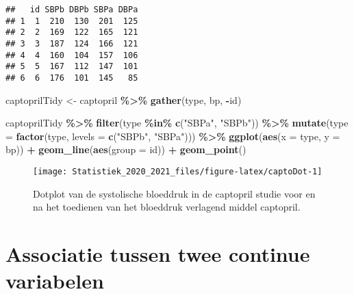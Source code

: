 \documentclass[
  12pt,dutch,coursenotes]{book}
\newenvironment{Shaded}{\begin{snugshade}}{\end{snugshade}}
\newcommand{\DataTypeTok}[1]{\textcolor[rgb]{0.13,0.29,0.53}{#1}}
\newcommand{\KeywordTok}[1]{\textcolor[rgb]{0.13,0.29,0.53}{\textbf{#1}}}
\newcommand{\NormalTok}[1]{#1}
\newcommand{\OperatorTok}[1]{\textcolor[rgb]{0.81,0.36,0.00}{\textbf{#1}}}
\newcommand{\StringTok}[1]{\textcolor[rgb]{0.31,0.60,0.02}{#1}}
\theoremstyle{definition}
\theoremstyle{definition}
\theoremstyle{definition}
\theoremstyle{remark}
\begin{document}
\begin{verbatim}
##   id SBPb DBPb SBPa DBPa
## 1  1  210  130  201  125
## 2  2  169  122  165  121
## 3  3  187  124  166  121
## 4  4  160  104  157  106
## 5  5  167  112  147  101
## 6  6  176  101  145   85
\end{verbatim}

\begin{Shaded}
\begin{Highlighting}[]
\NormalTok{captoprilTidy \textless{}{-}}\StringTok{ }\NormalTok{captopril }\OperatorTok{\%\textgreater{}\%}\StringTok{ }\KeywordTok{gather}\NormalTok{(type, bp, }\OperatorTok{{-}}\NormalTok{id)}

\NormalTok{captoprilTidy }\OperatorTok{\%\textgreater{}\%}\StringTok{ }\KeywordTok{filter}\NormalTok{(type }\OperatorTok{\%in\%}\StringTok{ }\KeywordTok{c}\NormalTok{(}\StringTok{"SBPa"}\NormalTok{, }\StringTok{"SBPb"}\NormalTok{)) }\OperatorTok{\%\textgreater{}\%}\StringTok{ }
\StringTok{    }\KeywordTok{mutate}\NormalTok{(}\DataTypeTok{type =} \KeywordTok{factor}\NormalTok{(type, }\DataTypeTok{levels =} \KeywordTok{c}\NormalTok{(}\StringTok{"SBPb"}\NormalTok{, }\StringTok{"SBPa"}\NormalTok{))) }\OperatorTok{\%\textgreater{}\%}\StringTok{ }
\StringTok{    }\KeywordTok{ggplot}\NormalTok{(}\KeywordTok{aes}\NormalTok{(}\DataTypeTok{x =}\NormalTok{ type, }\DataTypeTok{y =}\NormalTok{ bp)) }\OperatorTok{+}\StringTok{ }\KeywordTok{geom\_line}\NormalTok{(}\KeywordTok{aes}\NormalTok{(}\DataTypeTok{group =}\NormalTok{ id)) }\OperatorTok{+}\StringTok{ }
\StringTok{    }\KeywordTok{geom\_point}\NormalTok{()}
\end{Highlighting}
\end{Shaded}

\begin{figure}

{\centering \texttt{[image: Statistiek\_2020\_2021\_files/figure-latex/captoDot-1]} 

}

\caption{Dotplot van de systolische bloeddruk in de captopril studie voor en na het toedienen van het bloeddruk verlagend middel captopril.}\label{fig:captoDot}
\end{figure}

\hypertarget{sec:correlatie}{%
\section{Associatie tussen twee continue variabelen}\label{sec:correlatie}}
\end{document}
